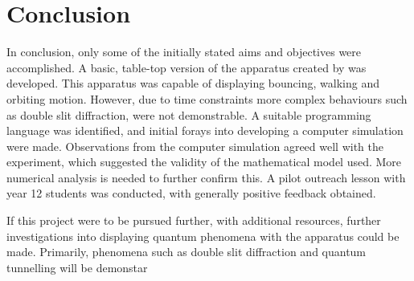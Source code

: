 \section{Conclusion}



In conclusion, only some of the initially stated aims and objectives were accomplished. A basic, table-top version of the apparatus created by \cite{couder} was developed. This apparatus was capable of displaying bouncing, walking and orbiting motion. However, due to time constraints more complex behaviours such as double slit diffraction, were not demonstrable. A suitable programming language was identified, and initial forays into developing a computer simulation were made. Observations from the computer simulation agreed well with the experiment, which suggested the validity of the mathematical model used. More numerical analysis is needed to further confirm this. A pilot outreach lesson with year 12 students was conducted, with generally positive feedback obtained. 

If this project were to be pursued further, with additional resources, further investigations into displaying quantum phenomena with the apparatus could be made. Primarily, phenomena such as double slit diffraction and quantum tunnelling will be demonstar